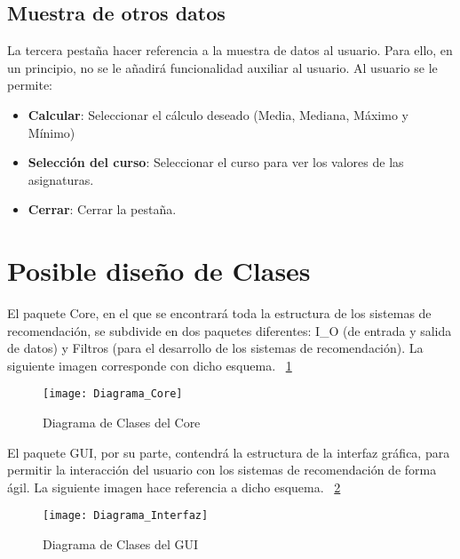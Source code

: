 \subsection{Muestra de otros datos}
La tercera pestaña hacer referencia  a la muestra de datos al usuario. Para ello, en un principio, no se le añadirá funcionalidad auxiliar al usuario.
Al usuario se le permite: 
\begin{itemize}
\item \textbf{Calcular}: Seleccionar el cálculo deseado (Media, Mediana, Máximo y Mínimo)
\item\textbf{Selección del curso}: Seleccionar el curso para ver los valores de las asignaturas. 
\item \textbf{Cerrar}: Cerrar la pestaña. 
\end{itemize}

\section{Posible diseño de Clases} 
El paquete Core,  en el que se encontrará toda la estructura de los sistemas de recomendación, se subdivide en dos paquetes diferentes: I\_O (de entrada y salida de datos) y Filtros (para el desarrollo de los sistemas de recomendación). La siguiente imagen corresponde con dicho esquema. 
 ~\ref{fig:C.3.5}
\begin{figure}[h]
\centering
\texttt{[image: Diagrama\_Core]}
\caption{Diagrama de Clases del Core}
\label{fig:C.3.5}
\end{figure}
El paquete GUI, por su parte, contendrá la estructura de la interfaz gráfica, para permitir la interacción del usuario con los sistemas de recomendación de forma ágil. La siguiente imagen hace referencia a dicho esquema.  ~\ref{fig:C.3.6}
\begin{figure}[h]
\centering
\texttt{[image: Diagrama\_Interfaz]}
\caption{Diagrama de Clases del GUI}
\label{fig:C.3.6}
\end{figure}
